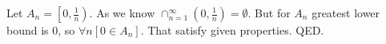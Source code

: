 \documentclass{article}
\begin{document}
Let $A_{n}=\left[0,\frac{1}{n}\right)$. As we know $\cap_{n=1}^{\infty}\left(0,\frac{1}{n}\right)=\emptyset$. But for $A_{n}$ greatest lower bound is 0, so $\forall n [0 \in A_{n}]$. That satisfy given properties.
\newline
QED.
\end{document}

